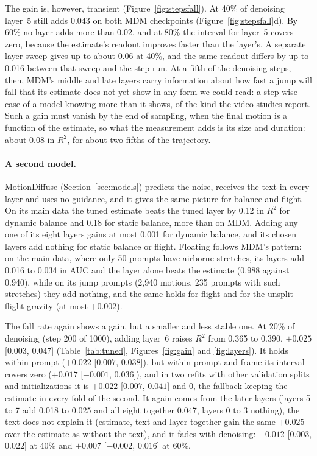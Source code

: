 The gain is, however, transient (Figure~\ref{fig:stepsfall}). At 40\% of denoising layer~5 still adds 0.043 on both MDM checkpoints (Figure~\ref{fig:stepsfall}d). By 60\% no layer adds more than 0.02, and at 80\% the interval for layer~5 covers zero, because the estimate's readout improves faster than the layer's. A separate layer sweep gives up to about 0.06 at 40\%, and the same readout differs by up to 0.016 between that sweep and the step run. At a fifth of the denoising steps, then, MDM's middle and late layers carry information about how fast a jump will fall that its estimate does not yet show in any form we could read: a step-wise case of a model knowing more than it shows, of the kind the video studies report. Such a gain must vanish by the end of sampling, when the final motion is a function of the estimate, so what the measurement adds is its size and duration: about 0.08 in $R^2$, for about two fifths of the trajectory.

\paragraph{A second model.} MotionDiffuse (Section~\ref{sec:models}) predicts the noise, receives the text in every layer and uses no guidance, and it gives the same picture for balance and flight. On its main data the tuned estimate beats the tuned layer by 0.12 in $R^2$ for dynamic balance and 0.18 for static balance, more than on MDM. Adding any one of its eight layers gains at most 0.001 for dynamic balance, and its chosen layers add nothing for static balance or flight. Floating follows MDM's pattern: on the main data, where only 50 prompts have airborne stretches, its layers add 0.016 to 0.034 in AUC and the layer alone beats the estimate (0.988 against 0.940), while on its jump prompts (2,940 motions, 235 prompts with such stretches) they add nothing, and the same holds for flight and for the unsplit flight gravity (at most $+0.002$).

The fall rate again shows a gain, but a smaller and less stable one. At 20\% of denoising (step 200 of 1000), adding layer~6 raises $R^2$ from 0.365 to 0.390, $+0.025$ [$0.003$, $0.047$] (Table~\ref{tab:tuned}, Figures~\ref{fig:gain} and \ref{fig:layers}). It holds within prompt ($+0.022$ [$0.007$, $0.038$]), but within prompt and frame its interval covers zero ($+0.017$ [$-0.001$, $0.036$]), and in two refits with other validation splits and initializations it is $+0.022$ [$0.007$, $0.041$] and 0, the fallback keeping the estimate in every fold of the second. It again comes from the later layers (layers 5 to 7 add 0.018 to 0.025 and all eight together 0.047, layers 0 to 3 nothing), the text does not explain it (estimate, text and layer together gain the same $+0.025$ over the estimate as without the text), and it fades with denoising: $+0.012$ [$0.003$, $0.022$] at 40\% and $+0.007$ [$-0.002$, $0.016$] at 60\%.

